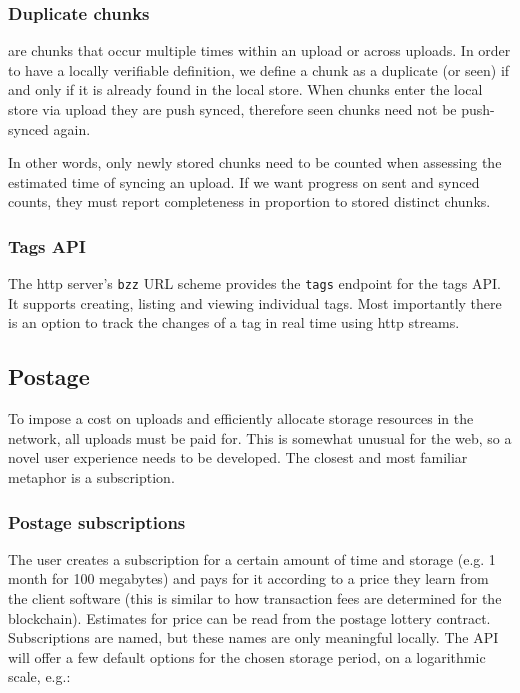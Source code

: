 \subsubsection{Duplicate chunks}

 are chunks that occur multiple times within an upload or across uploads. In order to have a locally verifiable definition, we define a chunk as a duplicate (or seen) if and only if it is already found in the local store.
When chunks enter the local store via upload they are push synced, therefore seen chunks need not be push-synced again.

In other words, only newly stored chunks need to be counted when assessing the estimated time of syncing an upload. If we want progress on sent and synced counts, they must report completeness in proportion to stored distinct chunks.

\subsubsection{Tags API} 

The http server's \lstinline{bzz} URL scheme provides the \lstinline{tags} endpoint for the tags API. It supports creating, listing and viewing individual tags. Most importantly there is an option to track the changes of a tag in real time using http streams.



\subsection{Postage \statusgreen}\label{sec:postage-ux}

To impose a cost on uploads and efficiently allocate storage resources in the network, all uploads must be paid for.  This is somewhat unusual for the web, so a novel user experience needs to be developed. The closest and most familiar metaphor is a subscription.

\subsubsection{Postage subscriptions}

The user creates a subscription for a certain amount of time and storage (e.g. 1 month for 100 megabytes) and pays for it according to a price they learn from the client software (this is similar to how transaction fees are determined for the blockchain). Estimates for price can be read from the postage lottery contract. Subscriptions are named, but these names are only meaningful locally. The API will offer a few default options for the chosen storage period, on a logarithmic scale, e.g.: 

